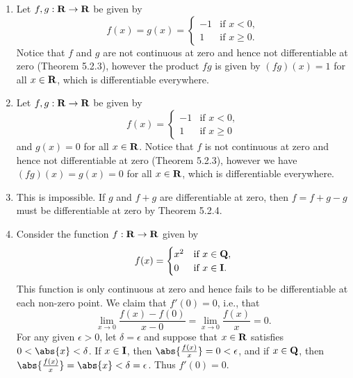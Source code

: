 \documentclass{lew98_solutions}
\begin{document}
\begin{solution}
    \begin{enumerate}
        \item Let \( f, g : \mathbf{R} \to \mathbf{R} \) be given by
        \[
            f(x) = g(x) = \begin{cases}
                -1 & \text{if } x < 0, \\
                1 & \text{if } x \geq 0.
            \end{cases}
        \]
        Notice that \( f \) and \( g \) are not continuous at zero and hence not differentiable at zero (Theorem 5.2.3), however the product \( fg \) is given by \( (fg)(x) = 1 \) for all \( x \in \mathbf{R} \), which is differentiable everywhere.

        \item Let \( f, g : \mathbf{R} \to \mathbf{R} \) be given by
        \[
            f(x) = \begin{cases}
                -1 & \text{if } x < 0, \\
                1 & \text{if } x \geq 0
            \end{cases}
        \]
        and \( g(x) = 0 \) for all \( x \in \mathbf{R} \). Notice that \( f \) is not continuous at zero and hence not differentiable at zero (Theorem 5.2.3), however we have \( (fg)(x) = g(x) = 0 \) for all \( x \in \mathbf{R} \), which is differentiable everywhere.

        \item This is impossible. If \( g \) and \( f + g \) are differentiable at zero, then \( f = f + g - g \) must be differentiable at zero by Theorem 5.2.4.

        \item Consider the function \( f : \mathbf{R} \to \mathbf{R} \) given by
        \[
            f(x) = \begin{cases}
                x^2 & \text{if } x \in \mathbf{Q}, \\
                0 & \text{if } x \in \mathbf{I}.
            \end{cases}
        \]
        This function is only continuous at zero and hence fails to be differentiable at each non-zero point. We claim that \( f'(0) = 0 \), i.e., that
        \[
            \lim_{x \to 0} \frac{f(x) - f(0)}{x - 0} = \lim_{x \to 0} \frac{f(x)}{x} = 0.
        \]
        For any given \( \epsilon > 0 \), let \( \delta = \epsilon \) and suppose that \( x \in \mathbf{R} \) satisfies \( 0 < \abs{x} < \delta \). If \( x \in \mathbf{I} \), then \( \abs{\tfrac{f(x)}{x}} = 0 < \epsilon \), and if \( x \in \mathbf{Q} \), then \( \abs{\tfrac{f(x)}{x}} = \abs{x} < \delta = \epsilon \). Thus \( f'(0) = 0 \).
    \end{enumerate}
\end{solution}
\end{document}
